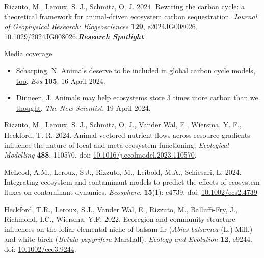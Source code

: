 \documentclass[11pt, letterpaper]{awesome-cv}
\begin{document}
\begin{etaremune}[topsep=0pt,itemsep=1pt,partopsep=0pt,parsep=0pt]
  \renewcommand\labelenumi{\bfseries\theenumi .}
  \item \textcolor{awesome}{Rizzuto, M.}, Leroux, S. J., Schmitz, O. J. 2024. Rewiring the carbon cycle: a theoretical framework for animal-driven ecosystem carbon sequestration. \emph{Journal of Geophysical Research: Biogeosciences} \textbf{129}, e2024JG008026. \href{https://agupubs.onlinelibrary.wiley.com/doi/epdf/10.1029/2024JG008026?domain=author&token=JQVUWF9NSSQKUTSE44C6}{10.1029/2024JG008026}.\null\hfill\textbf{\textit{Research Spotlight}}
  \vspace{.3em}
  \begin{description}
    \item[\bodyfontlight Media coverage]
  \end{description}
  \begin{itemize}
      \item Scharping, N. \href{https://doi.org/10.1029/2024EO240170}{Animals deserve to be included in global carbon cycle models, too}. \emph{Eos} \textbf{105}. 16 April 2024.
      \item Dinneen, J. \href{https://www.newscientist.com/article/2427674-animals-may-help-ecosystems-store-3-times-more-carbon-than-we-thought/}{Animals may help ecosystems store 3 times more carbon than we thought}. \emph{The New Scientist}. 19 April 2024.
  \end{itemize}
  \item \textcolor{awesome}{Rizzuto, M.}, Leroux, S. J., Schmitz, O. J., Vander Wal, E., Wiersma, Y. F., Heckford, T. R. 2024. Animal-vectored nutrient flows across resource gradients influence the nature of local and meta-ecosystem functioning. \emph{Ecological Modelling} \textbf{488}, 110570. doi: \href{https://doi.org/10.1016/j.ecolmodel.2023.110570}{10.1016/j.ecolmodel.2023.110570}.
  \item McLeod, A.M., Leroux, S.J., \textcolor{awesome}{Rizzuto, M.}, Leibold, M.A., Schiesari, L. 2024. Integrating ecosystem and contaminant models to predict the effects of ecosystem fluxes on contaminant dynamics. \emph{Ecosphere}, \textbf{15}(1): e4739. doi: \href{https://doi.org/10.1002/ecs2.4739}{10.1002/ecs2.4739}
  \item Heckford, T.R., Leroux, S.J., Vander Wal, E., \textcolor{awesome}{Rizzuto, M.}, Balluffi-Fry, J., Richmond, I.C., Wiersma, Y.F. 2022. Ecoregion and community structure influences on the foliar elemental niche of balsam fir (\textit{Abies balsamea} (L.) Mill.) and white birch (\textit{Betula papyrifera} Marshall). \emph{Ecology and Evolution} \textbf{12}, e9244. doi: \href{https://doi.org/10.1002/ece3.9244}{10.1002/ece3.9244}.

\end{etaremune}
\end{document}
